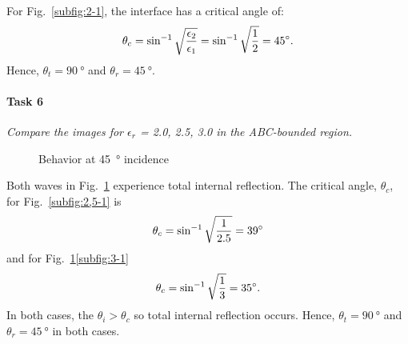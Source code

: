 For Fig.~\ref{subfig:2-1}, the interface has a critical angle of:
\begin{equation*}
	\theta_c = \sin^{-1} \sqrt{{\epsilon_2 \over \epsilon_1}} = \sin^{-1} \sqrt{{1 \over 2}} = \SI{45}{\degree}.
\end{equation*}
Hence, $\theta_t = \SI{90}{\degree}$ and $\theta_r = \SI{45}{\degree}$.

\paragraph{Task 6}\textit{Compare the images for $\epsilon_r$ = 2.0, 2.5, 3.0 in the ABC-bounded region.}

\begin{figure}[htpb]
	\caption{Behavior at \SI{45}{\degree} incidence}
	\label{fig:TIR}
\end{figure}

Both waves in Fig.~\ref{fig:TIR} experience total internal reflection.
The critical angle, $\theta_c$, for Fig.~\ref{subfig:2,5-1} is
\begin{equation*}
	\theta_c = \sin^{-1} \sqrt{{1 \over 2.5}} = \SI{39}{\degree}
\end{equation*}
and for Fig.~\ref{fig:TIR}\ref{subfig:3-1}
\begin{equation*}
	\theta_c = \sin^{-1} \sqrt{{1 \over 3}} = \SI{35}{\degree}.
\end{equation*}
In both cases, the $\theta_i > \theta_c$ so total internal reflection occurs.
Hence, $\theta_t = \SI{90}{\degree}$ and $\theta_r = \SI{45}{\degree}$ in both cases.

